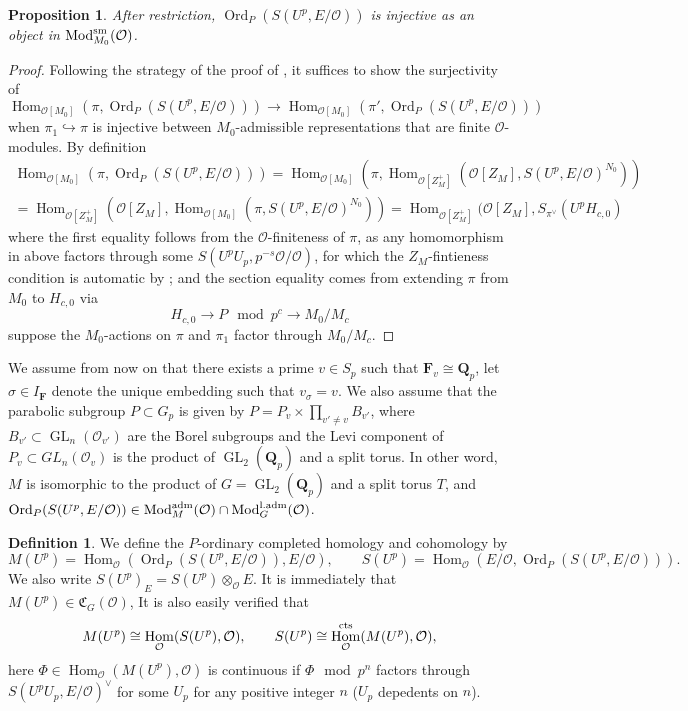 \documentclass[leqno]{amsart}
\newcommand{\aMod}{\textnormal{Mod}^{\textnormal{adm}}}
\newcommand{\laMod}{\textnormal{Mod}^{\textnormal{l.adm}}}
\DeclareMathOperator{\Mod}{\textnormal{Mod}}
\newcommand{\fC}{\mathfrak C}
\DeclareMathOperator{\Ord}{Ord}
\newcommand{\cts}{\textnormal{cts}}
\newcommand{\sm}{\textnormal{sm}}
\DeclareMathOperator{\GL}{GL}
\newcommand{\Q}{{\mathbf{Q}}}
\newcommand{\Qp}{\mathbf{Q}_p}
\newcommand{\F}{{\mathbf{F}}} %
\newcommand{\oo}{\mathcal{O}} %
\DeclareMathOperator{\Hom}{Hom}
\newtheorem{prop}[thm]{Proposition}
\theoremstyle{definition}
\newtheorem{defn}[thm]{Definition}
\theoremstyle{remark}
\begin{document}
\begin{prop}
	After restriction, 
	$\Ord_P(S(U^p,E/\oo))$ is injective
	as an object in $\Mod^{\sm}_{M_0}(\oo)$.
\end{prop}
\begin{proof}
	Following the strategy of the proof of 
	\cite[Prop 3.2.4]{pan}, it suffices to show the surjectivity of
	\[
		\Hom_{\oo[M_0]}(\pi,\Ord_P(S(U^p,E/\oo)))\to 
		\Hom_{\oo[M_0]}(\pi',\Ord_P(S(U^p,E/\oo)))
	\]
	when $\pi_{1}\hookrightarrow \pi$ 
	is injective between $M_0$-admissible
	representations that are finite $\oo$-modules.
	By definition
	\begin{multline*}
		\Hom_{\oo[M_0]}(\pi,\Ord_P(S(U^p,E/\oo)))=
		\Hom_{\oo[M_0]}(\pi,
		\Hom_{\oo[Z_M^+]}
		(\oo[Z_M], S(U^p,E/\oo)^{N_0}))\\=
		\Hom_{\oo[Z_M^+]}(\oo[Z_M],
		\Hom_{\oo[M_0]}(\pi, S(U^p,E/\oo)^{N_0}))=
		\Hom_{\oo[Z_M^+]}(\oo[Z_M],
		S_{\pi^\vee}(U^pH_{c,0})
	\end{multline*}
	where the first equality follows from the $\oo$-finiteness of $\pi$,
	as any homomorphism in above factors through some 
	$S(U^pU_p,p^{-s}\oo/\oo)$,
	for which
	the $Z_M$-fintieness condition is automatic
	by \cite[Lem 3.1.5]{emeI};
	and the section equality comes from 
	extending $\pi$ from  $M_0$ to  $H_{c,0}$ via
	\[
		H_{c,0}\to P \mod p^c\to M_0/M_c
	\]
	suppose the $M_0$-actions on  $\pi$ and  $\pi_1$
	factor through  $M_0/M_c$.
\end{proof}




We assume from now on that 
there exists a prime $v\in S_p$
such that  $\F_v\cong \Qp$,
let  $\sigma\in I_\F$
denote the unique embedding such that  $v_\sigma=v$.
We also assume that 
the parabolic subgroup $P\subset G_p$ is given by 
$P=P_v\times\prod_{v'\neq v}B_{v'}$,
where $B_{v'}\subset \GL_n(\oo_{v'})$
are the Borel subgroups
and the Levi component of $P_v\subset GL_n(\oo_v)$
is the product of $\GL_2(\Q_p)$ and a split torus.
In other word, $M$ is isomorphic to the product  
of  $G=\GL_2(\Qp)$ and a split torus  $T$,
and  $\Ord_P(S(U^p,E/\oo))\in \aMod_M(\oo)\cap \laMod_{G}(\oo)$.
\begin{defn}
	We define the $P$-ordinary completed homology and cohomology by
	\begin{equation*}
		M(U^p)=\Hom_\oo(\Ord_P(S(U^p,E/\oo)),E/\oo),\qquad
		S(U^p)=\Hom_\oo(E/\oo, \Ord_P(S(U^p,E/\oo))).
	\end{equation*}
	We also write $S(U^p)_E=S(U^p)\otimes_\oo E$.
	It is immediately that 
	$M(U^p)\in \fC_{G}(\oo)$,
	It is also easily verified that 
	\[
		M(U^p)\cong \Hom_\oo(S(U^p),\oo),\qquad
		S(U^p)\cong \Hom_\oo^{\cts}(M(U^p),\oo),
	\]
	here $\Phi\in \Hom_\oo(M(U^p),\oo)$ 
	is continuous if 
	$\Phi \mod p^n$ factors through
	$S(U^pU_p,E/\oo)^\vee$ for some $U_p$
	for any positive integer $n$
	($U_p$ depedents on  $n$).
\end{defn}
\end{document}
